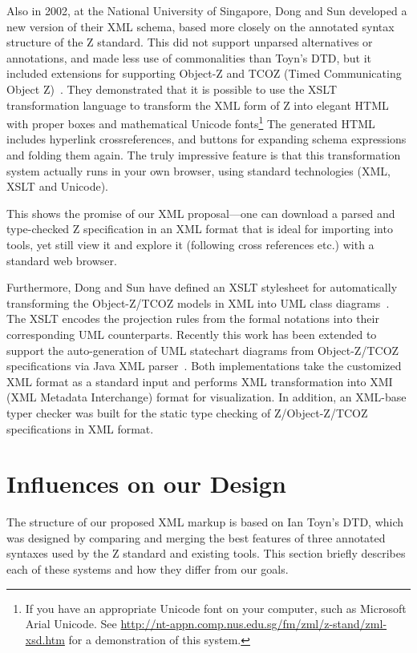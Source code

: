 \documentclass{llncs}  %
\begin{document}
Also in 2002, at the National University of Singapore, Dong and Sun
developed a new version of their XML schema, based more closely on
the annotated syntax structure of the Z standard.  This did not
support unparsed alternatives or annotations, and made less use of
commonalities than Toyn's DTD, but it included extensions 
for supporting Object-Z and TCOZ (Timed Communicating Object Z)~\cite{md99a}.
They demonstrated that it is possible to use the XSLT transformation
language to transform the XML form of Z into elegant HTML with proper boxes
and mathematical Unicode fonts\footnote{If you have an appropriate Unicode
  font on your computer, such as Microsoft Arial Unicode.  See
  \url{http://nt-appn.comp.nus.edu.sg/fm/zml/z-stand/zml-xsd.htm} for 
  a demonstration of this system.} 
The generated HTML includes hyperlink crossreferences, and buttons for
expanding schema expressions and folding them again.  The truly impressive
feature is that this transformation system actually runs in your own
browser, using standard technologies (XML, XSLT and Unicode).

This shows the promise of our XML proposal---one can download a parsed
and type-checked Z specification in an XML format that is ideal for
importing into tools, yet still view it and explore it (following
cross references etc.) with a standard web browser.

Furthermore, Dong and Sun have defined an XSLT stylesheet for
automatically transforming the Object-Z/TCOZ models in XML into UML
class diagrams~\cite{sun01www}. The XSLT encodes the projection rules
from the formal notations into their corresponding UML
counterparts. Recently this work has been extended to support the
auto-generation of UML statechart diagrams from Object-Z/TCOZ
specifications via Java XML parser~\cite{dong02icfem}. Both
implementations take the customized XML format as a standard input and
performs XML transformation into XMI (XML Metadata Interchange) format
for visualization. In addition, an XML-base typer checker was built
for the static type checking of Z/Object-Z/TCOZ specifications in XML
format.


\section{Influences on our Design}

The structure of our proposed XML markup is based on Ian Toyn's DTD,
which was designed by comparing and merging the best features
of three annotated syntaxes used by the Z standard and existing tools.
This section briefly describes each of these systems and how they
differ from our goals.
\end{document}
